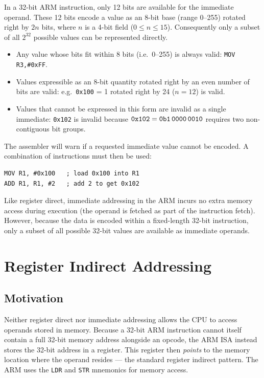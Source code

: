 \documentclass[11pt, a4paper, notitlepage]{report}
\theoremstyle{definition}
\theoremstyle{remark}
\theoremstyle{definition}
\begin{document}
In a 32-bit ARM instruction, only 12 bits are available for the immediate operand. These 12 bits encode a value as an 8-bit base (range 0--255) rotated right by $2n$ bits, where $n$ is a 4-bit field ($0 \le n \le 15$). Consequently only a subset of all $2^{32}$ possible values can be represented directly.

\begin{itemize}
  \item Any value whose bits fit within 8 bits (i.e.\ 0--255) is always valid: \texttt{MOV R3,\#0xFF}.
  \item Values expressible as an 8-bit quantity rotated right by an even number of bits are valid: e.g.\ \texttt{0x100} = 1 rotated right by 24 ($n = 12$) is valid.
  \item Values that cannot be expressed in this form are invalid as a single immediate: \texttt{0x102} is invalid because $\texttt{0x102} = \texttt{0b1\,0000\,0010}$ requires two non-contiguous bit groups.
\end{itemize}

\begin{warning}[title={Not All Constants Are Valid Immediates}]
The assembler will warn if a requested immediate value cannot be encoded. A combination of instructions must then be used:
\begin{lstlisting}
MOV R1, #0x100   ; load 0x100 into R1
ADD R1, R1, #2   ; add 2 to get 0x102
\end{lstlisting}
\end{warning}

\begin{keyresult}[title={Immediate Addressing Efficiency}]
Like register direct, immediate addressing in the ARM incurs no extra memory access during execution (the operand is fetched as part of the instruction fetch). However, because the data is encoded within a fixed-length 32-bit instruction, only a subset of all possible 32-bit values are available as immediate operands.
\end{keyresult}

\section{Register Indirect Addressing}

\subsection{Motivation}

Neither register direct nor immediate addressing allows the CPU to access operands stored in memory. Because a 32-bit ARM instruction cannot itself contain a full 32-bit memory address alongside an opcode, the ARM ISA instead stores the 32-bit address in a register. This register then \emph{points} to the memory location where the operand resides --- the standard register indirect pattern. The ARM uses the \texttt{LDR} and \texttt{STR} mnemonics for memory access.
\end{document}
